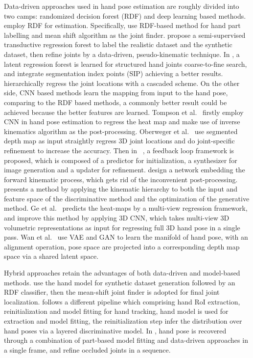 \documentclass[journal,comsoc]{IEEEtran}
\begin{document}
Data-driven approaches used in hand pose estimation are roughly divided into two camps: randomized decision forest (RDF)
and deep learning based methods. \cite{keskin2012hand,tang2013real,tang2014latent,sun2015cascaded,li20153d} employ RDF
for estimation. Specifically, \cite{keskin2012hand} use RDF-based method for hand part labelling and mean shift algorithm
as the joint finder. \cite{tang2013real} propose a semi-supervised transductive regression forest to label the realistic
dataset and the synthetic dataset, then refine joints by a data-driven, pseudo-kinematic technique. In \cite{tang2014latent},
a latent regression forest is learned for structured hand joints coarse-to-fine search, and \cite{li20153d} integrate
segmentation index points (SIP) achieving a better results. \cite{sun2015cascaded} hierarchically regress the joint
locations with a cascaded scheme. On the other side, CNN based methods learn the mapping from input to the hand pose,
comparing to the RDF based methods, a commonly better result could be achieved because the better features are learned.
Tompson et al.~\cite{tompson2014real} firstly employ CNN in hand pose estimation to regress the heat map and make use
of inverse kinematics algorithm as the post-processing. Oberweger et al.~\cite{oberweger2015hands} use segmented depth
map as input straightly regress 3D joint locations and do joint-specific refinement to increase the accuracy. Then in
~\cite{oberweger2015training}, a feedback loop framework is proposed, which is composed of a predictor for initialization,
a synthesizer for image generation and a updater for refinement. \cite{zhou2016model} design a network embedding the
forward kinematic process, which gets rid of the inconvenient post-processing. \cite{ye2016spatial} presents a method
by applying the kinematic hierarchy to both the input and feature space of the discriminative method and the optimization
of the generative method. Ge et al.~\cite{ge2016robust} predicts the heat-maps by a multi-view regression framework, and
\cite{ge2017_3D} improve this method by applying 3D CNN, which takes multi-view 3D volumetric representations as input for
regressing full 3D hand pose in a single pass. Wan et al.~\cite{wan2017crossing} use VAE and GAN to learn the manifold of
hand pose, with an alignment operation, pose space are projected into a corresponding depth map space via a shared latent
space.

Hybrid approaches\cite{keskin2013real, sharp2015accurate,madadi2017occlusion} retain the advantages of both data-driven and
model-based methods. \cite{keskin2013real} use the hand model for synthetic dataset generation followed by an RDF classifier,
then the mean-shift joint finder is adopted for final joint localization. \cite{sharp2015accurate} follows a different pipeline
which comprising hand RoI extraction, reinitialization and model fitting for hand tracking, hand model is used for extraction
and model fitting, the reinitialization step infer the distribution over hand poses via a layered discriminative model. In
\cite{madadi2017occlusion}, hand pose is recovered through a combination of part-based model fitting and data-driven approaches
in a single frame, and refine occluded joints in a sequence.
\end{document}
